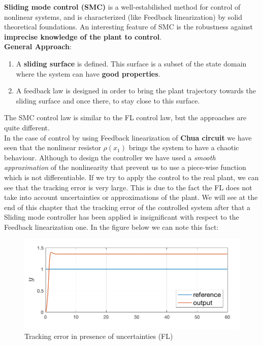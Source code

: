 \textbf{Sliding mode control (SMC)} is a well-estabilished method for control of nonlinear systems, and is characterized (like Feedback linearization) by solid theoretical foundations. An interesting feature of SMC is the robustness against \textbf{imprecise knowledge of the plant to control}. \\
\textbf{General Approach}:
\begin{enumerate}
    \item A \textbf{sliding surface} is defined. This surface is a subset of the state domain where the system can have \textbf{good properties}.
    \item A feedback law is designed in order to bring the plant trajectory towards the sliding surface and once there, to stay close to this surface. 
\end{enumerate}

The SMC control law is similar to the FL control law, but the approaches are quite different. \\
In the case of control by using Feedback linearization of \textbf{Chua circuit} we have seen that the nonlinear resistor $\rho({x_1})$ brings the system to have a chaotic behaviour. Although to design the controller we have used a \textit{smooth approximation} of the nonlinearity that prevent us to use a piece-wise function which is not differentiable. If we try to apply the control to the real plant, we can see that the tracking error is very large. This is due to the fact the FL does not take into account uncertainties or approximations of the plant. We will see at the end of this chapter that the tracking error of the controlled system after that a Sliding mode controller has been applied is insignificant with respect to the Feedback linearization one. In the figure below we can note this fact: 

\begin{figure}[h]
    \centering
    \includegraphics[scale=0.7]{NonLinearControl/images/FL_tracking.png}
    \caption{Tracking error in presence of uncertainties (FL)}
    \label{fig:enter-label}
\end{figure}

